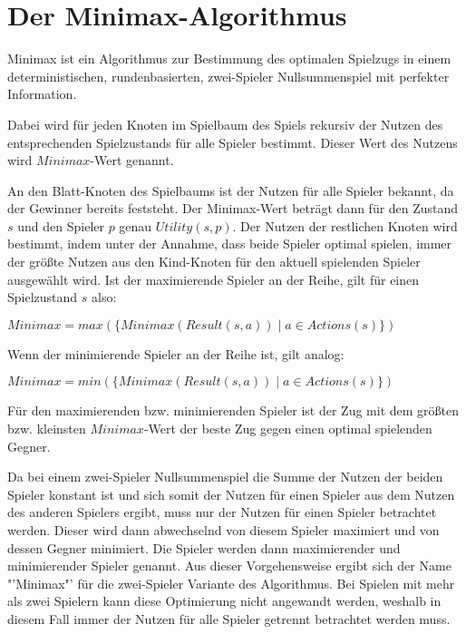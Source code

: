 \section{Der Minimax-Algorithmus}
\label{sec:minimax}

Minimax ist ein Algorithmus zur Bestimmung des optimalen Spielzugs in einem deterministischen, rundenbasierten,
zwei-Spieler Nullsummenspiel mit perfekter Information.

Dabei wird für jeden Knoten im Spielbaum des Spiels rekursiv der Nutzen des entsprechenden Spielzustands für alle
Spieler bestimmt. Dieser Wert des Nutzens wird $Minimax$-Wert genannt.

An den Blatt-Knoten des Spielbaums ist der Nutzen für alle Spieler bekannt, da der Gewinner bereits feststeht. Der
Minimax-Wert beträgt dann für den Zustand $s$ und den Spieler $p$ genau $Utility(s, p)$. Der Nutzen der restlichen Knoten
wird bestimmt, indem unter der Annahme, dass beide Spieler optimal spielen, immer der größte Nutzen aus den Kind-Knoten
für den aktuell spielenden Spieler ausgewählt wird. Ist der maximierende Spieler an der Reihe, gilt für einen
Spielzustand $s$ also:

\hspace*{1.3cm}
$Minimax=max(\{Minimax(Result(s, a)) \mid a \in Actions(s)\})$

Wenn der minimierende Spieler an der Reihe ist, gilt analog:

\hspace*{1.3cm}
$Minimax=min(\{Minimax(Result(s, a)) \mid a \in Actions(s)\})$

Für den maximierenden bzw. minimierenden Spieler ist der Zug mit dem größten bzw. kleinsten $Minimax$-Wert der beste Zug
gegen einen optimal spielenden Gegner.
\cite[S.~164f.]{ai2010russel}

Da bei einem zwei-Spieler Nullsummenspiel die Summe der Nutzen der beiden Spieler konstant ist und sich somit der
Nutzen für einen Spieler aus dem Nutzen des anderen Spielers ergibt, muss nur der Nutzen für einen Spieler betrachtet
werden. Dieser wird dann abwechselnd von diesem Spieler maximiert und von dessen Gegner minimiert. Die Spieler werden
dann maximierender und minimierender Spieler genannt. Aus dieser Vorgehensweise ergibt sich der Name "'Minimax"'
für die zwei-Spieler Variante des Algorithmus. Bei Spielen mit mehr als zwei Spielern kann diese Optimierung nicht
angewandt werden, weshalb in diesem Fall immer der Nutzen für alle Spieler getrennt betrachtet werden muss.
\cite[S.~165]{ai2010russel}




